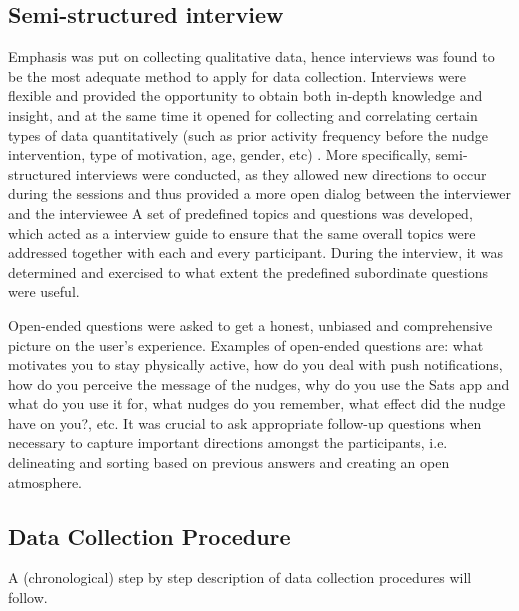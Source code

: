     \subsection{Semi-structured interview}
    Emphasis was put on collecting qualitative data, hence interviews was found to be the most adequate method to apply for data collection. Interviews were flexible and provided the opportunity to obtain both in-depth knowledge and insight, and at the same time it opened for collecting and correlating certain types of data quantitatively (such as prior activity frequency before the nudge intervention,  type of motivation, age, gender, etc) \cite{karl_chapter_nodate}. More specifically, semi-structured interviews were conducted, as they allowed new directions to occur during the sessions and thus provided a more open dialog between the interviewer and the interviewee
    A set of predefined topics and questions was developed, which acted as a interview guide to ensure that the same overall topics were addressed together with each and every participant. During the interview, it was determined and exercised to what extent the predefined subordinate questions were useful. 

    Open-ended questions were asked to get a honest, unbiased and comprehensive picture on the user’s experience\cite{lazar_research_2017}. Examples of open-ended questions are: what motivates you to stay physically active, how do you deal with push notifications, how do you perceive the message of the nudges, why do you use the Sats app and what do you use it for, what nudges do you remember, what effect did the nudge have on you?, etc. It was crucial to ask appropriate follow-up questions when necessary to capture important directions amongst the participants, i.e. delineating and sorting based on previous answers and creating an open atmosphere.
 
    \subsection{Data Collection Procedure}
    A (chronological) step by step description of data collection procedures will follow.
    
